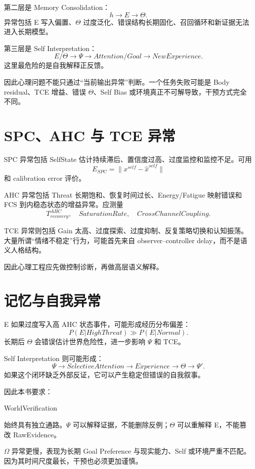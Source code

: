 第二层是 Memory Consolidation：
\[
h\rightarrow E\rightarrow\Theta.
\]
异常包括 E 写入偏置、$\Theta$ 过度泛化、错误结构长期固化、召回循环和新证据无法进入长期模型。

第三层是 Self Interpretation：
\[
E/\Theta
\rightarrow
\Psi
\rightarrow
Attention/Goal
\rightarrow
NewExperience.
\]
这里最危险的是自我解释正反馈。

因此心理问题不能只通过“当前输出异常”判断。一个任务失败可能是 Body residual、TCE 增益、错误 $\Theta$、Self Bias 或环境真正不可解导致，干预方式完全不同。

\section{SPC、AHC 与 TCE 异常}

SPC 异常包括 SelfState 估计持续滞后、置信度过高、过度监控和监控不足。可用
\[
E_{SPC}
=
\|x^{self}-\hat x^{self}\|
\]
和 calibration error 评价。

AHC 异常包括 Threat 长期饱和、恢复时间过长、Energy/Fatigue 映射错误和 FCS 到内稳态状态的增益异常。应测量
\[
T_{recovery}^{AHC},
\quad
SaturationRate,
\quad
CrossChannelCoupling.
\]

TCE 异常则包括 Gain 太高、过度探索、过度抑制、反复策略切换和认知振荡。大量所谓“情绪不稳定”行为，可能首先来自 observer--controller delay，而不是语义人格结构。

因此心理工程应先做控制诊断，再做高层语义解释。

\section{记忆与自我异常}

E 如果过度写入高 AHC 状态事件，可能形成经历分布偏差：
\[
P(E|HighThreat)
\gg
P(E|Normal).
\]
长期后 $\Theta$ 会错误估计世界危险性，进一步影响 $\Psi$ 和 TCE。

Self Interpretation 则可能形成：
\[
\Psi
\rightarrow
SelectiveAttention
\rightarrow
Experience
\rightarrow
\Theta
\rightarrow
\Psi'.
\]
如果这个闭环缺乏外部反证，它可以产生稳定但错误的自我叙事。

因此本书要求：
\begin{statementbox}
WorldVerification
\end{statementbox}
始终具有独立通路。$\Psi$ 可以解释证据，不能删除反例；$\Theta$ 可以重解释 E，不能篡改 RawEvidence。

$\Omega$ 异常更慢，表现为长期 Goal Preference 与现实能力、Self 或环境严重不匹配。因为其时间尺度最长，干预也必须更加谨慎。

